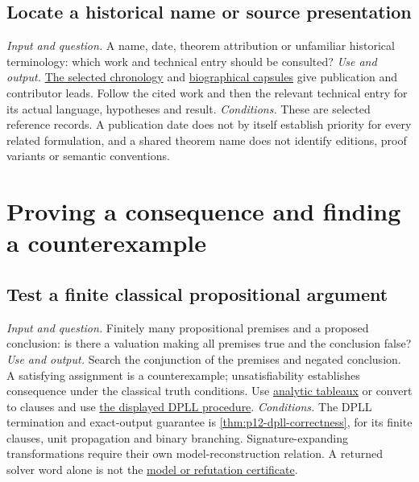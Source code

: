 \subsection{Locate a historical name or source presentation}
\label{sec:p14-finder-history}
\textit{Input and question.} A name, date, theorem attribution or unfamiliar
historical terminology: which work and technical entry should be consulted?
\textit{Use and output.}
\hyperref[sec:p13-chronology]{The selected chronology} and
\hyperref[sec:p13-biographies]{biographical capsules} give publication and
contributor leads. Follow the cited work and then the relevant technical
entry for its actual language, hypotheses and result.
\textit{Conditions.} These are selected reference records. A publication date
does not by itself establish priority for every related formulation, and a
shared theorem name does not identify editions, proof variants or semantic
conventions.

\section{Proving a consequence and finding a counterexample}
\label{sec:p14-finder-proving}

\subsection{Test a finite classical propositional argument}
\label{sec:p14-finder-propositional}
\textit{Input and question.} Finitely many propositional premises and a
proposed conclusion: is there a valuation making all premises true and the
conclusion false?
\textit{Use and output.} Search the conjunction of the premises and negated
conclusion. A satisfying assignment is a counterexample; unsatisfiability
establishes consequence under the classical truth conditions. Use
\hyperref[def:p02-cpl-tableau]{analytic tableaux} or convert to clauses and
use \hyperref[def:p12-dpll]{the displayed DPLL procedure}.
\textit{Conditions.} The DPLL termination and exact-output guarantee is
\cref{thm:p12-dpll-correctness}, for its finite clauses, unit propagation and
binary branching. Signature-expanding transformations require their own
model-reconstruction relation. A returned solver word alone is not the
\hyperref[def:p12-sat-certificate-boundary]{model or refutation certificate}.


